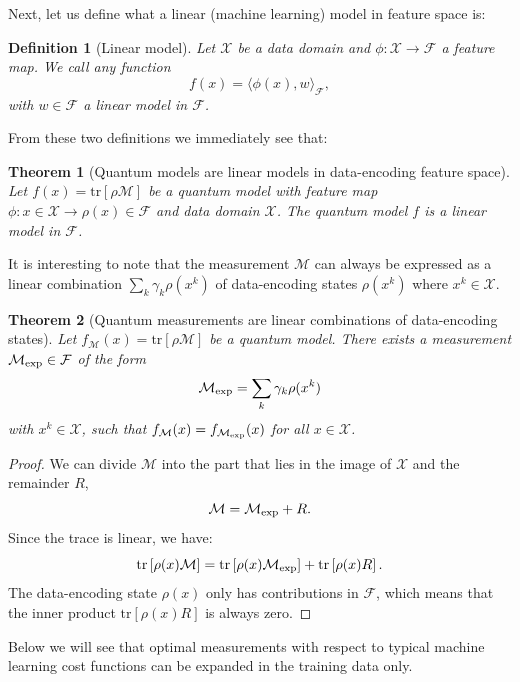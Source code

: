 \documentclass[aps, reprint, onecolumn, nofootinbib, longbibliography]{revtex4-2}
\newtheorem{theorem}{Theorem}[]
\newtheorem{definition}{Definition}[]
\newcommand{\tr}[1]{ \mathrm{tr}\left[#1\right] }
\newcommand{\meas}{\mathcal{M}}
\begin{document}
Next, let us define what a linear (machine learning) model in feature space is:

\begin{definition}[Linear model]
    Let $\mathcal{X}$ be a data domain and $\phi:\mathcal{X} \to \mathcal{F}$ a feature map. We call any function
    \begin{equation}
        f(x) = \langle \phi(x), w \rangle_{\mathcal{F}},
    \end{equation}
    with $w \in \mathcal{F}$ a linear model in $\mathcal{F}$.
\end{definition}

From these two definitions we immediately see that:
\begin{theorem}[Quantum models are linear models in data-encoding feature space] \label{thm:quantum_linear}
    Let $f(x) = \tr{\rho \meas}$ be a quantum model with feature map $\phi: x \in \mathcal{X} \to \rho(x) \in \mathcal{F}$ and data domain $\mathcal{X}$. The quantum model $f$ is a linear model in $\mathcal{F}$.
\end{theorem}

It is interesting to note that the measurement $\meas$ can always be expressed as a linear combination $\sum_k \gamma_k \rho(x^k)$ of data-encoding states $\rho(x^k)$ where $x^k \in \mathcal{X}$. 

\begin{theorem}[Quantum measurements are linear combinations of data-encoding states] \label{thm:measurement_expansion_general}
    Let $f_{\meas}(x) = \tr{\rho \meas}$ be a quantum model. There exists a measurement $ \meas_{\rm exp} \in \mathcal{F}$ of the form
    \begin{equation} \meas_{\rm exp} = \sum_k \gamma_k \rho(x^k)\end{equation}
    with $ x^k \in \mathcal{X}$, such that $f_{\meas}(x) = f_{\meas_{\rm exp}}(x)$ for all $x \in \mathcal{X}$. 
\end{theorem}

\begin{proof}
    We can divide $\meas$ into the part that lies in the image of $\mathcal{X}$ and the remainder $R$,
    \begin{equation}
        \meas = \meas_{\rm exp} + R.
    \end{equation}
    Since the trace is linear, we have:
    \begin{equation}
        \tr{\rho(x) \meas} = \tr{\rho(x)  \meas_{\rm exp}} + \tr{\rho(x) R}.
    \end{equation}
    The data-encoding state $\rho(x)$ only has contributions in $\mathcal{F}$, which means that the inner product $\tr{\rho(x) R}$ is always zero.
\end{proof}
Below we will see that optimal measurements with respect to typical machine learning cost functions can be expanded in the training data only.
\end{document}

